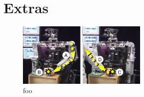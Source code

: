 
\section{Extras}


\begin{figure}[tbh]
  \centerline{\includegraphics[width=2.5in]{tracing_causes}}
  \caption{foo} 
\end{figure}

